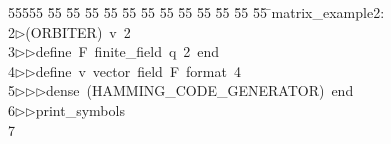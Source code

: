 %
%
\begin{tabbing}
55555 \= 55 \= 55 \= 55 \= 55 \= 55 \= 55 \= 55 \= 55 \= 55 \= 55 \= 55 \= 55 \= \>matrix\_example2:\\[0pt]
2\>$\triangleright$\>(ORBITER)\ v\ 2\ \\[0pt]
3\>$\triangleright$\>$\triangleright$\>define\ F\ finite\_field\ q\ 2\ end\ \\[0pt]
4\>$\triangleright$\>$\triangleright$\>define\ v\ vector\ field\ F\ format\ 4\ \\[0pt]
5\>$\triangleright$\>$\triangleright$\>$\triangleright$\>dense\ (HAMMING\_CODE\_GENERATOR)\ end\ \\[0pt]
6\>$\triangleright$\>$\triangleright$\>print\_symbols\\[0pt]
7\>\end{tabbing}
